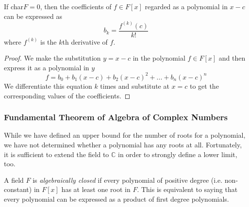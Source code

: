 \documentclass{article}
\begin{document}
      \begin{proposition}
        If char$F = 0$, then the coefficients of $f \in F[x]$ regarded as a polynomial in $x - c$ can be expressed as 
        \begin{equation}
          b_k = \frac{ f^{(k)} (c)}{k!}
        \end{equation}
        where $f^{(k)}$ is the $k$th derivative of $f$. 
      \end{proposition}
      \begin{proof}
        We make the substitution $ y = x-c$ in the polynomial $f \in F[x]$ and then express it as a polynomial in $y$ 
        \begin{equation}
          f = b_0 + b_1 (x-c) + b_2 (x-c)^2 + ... + b_n (x-c)^n
        \end{equation}
        We differentiate this equation $k$ times and substitute at $x = c$ to get the corresponding values of the coefficients.
      \end{proof}

    \subsubsection{Fundamental Theorem of Algebra of Complex Numbers}

      While we have defined an upper bound for the number of roots for a polynomial, we have not determined whether a polynomial has any roots at all. Fortunately, it is sufficient to extend the field to $\mathbb{C}$ in order to strongly define a lower limit, too. 

      \begin{definition}
        A field $F$ is \textit{algebraically closed} if every polynomial of positive degree (i.e. non-constant) in $F[x]$ has at least one root in $F$. This is equivalent to saying that every polynomial can be expressed as a product of first degree polynomials.
      \end{definition}
\end{document}
